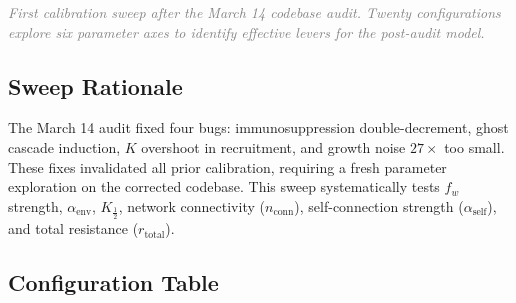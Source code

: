 \documentclass[11pt,a4paper,oneside]{article}
\newcommand{\sectionintro}[1]{%
    \noindent\textcolor{graytext}{\textit{#1}}\par\medskip
}
\begin{document}
\sectionintro{First calibration sweep after the March 14 codebase audit. Twenty configurations explore six parameter axes to identify effective levers for the post-audit model.}

\subsection{Sweep Rationale}

The March 14 audit fixed four bugs: immunosuppression double-decrement, ghost cascade induction, $K$ overshoot in recruitment, and growth noise $27\times$ too small. These fixes invalidated all prior calibration, requiring a fresh parameter exploration on the corrected codebase. This sweep systematically tests $f_w$ strength, $\alpha_{\text{env}}$, $K_{\frac{1}{2}}$, network connectivity ($n_{\text{conn}}$), self-connection strength ($\alpha_{\text{self}}$), and total resistance ($r_{\text{total}}$).

\subsection{Configuration Table}
\end{document}
